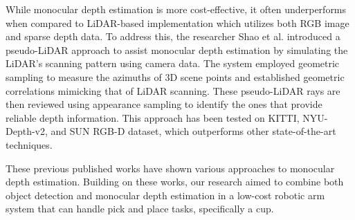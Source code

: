 \vspace{10pt}

While monocular depth estimation is more cost-effective, it often underperforms when compared to LiDAR-based implementation which utilizes both RGB image and sparse depth data. To address this, the researcher Shao et al. \cite{shuwei_shao__2024} introduced a pseudo-LiDAR approach to assist monocular depth estimation by simulating the LiDAR’s scanning pattern using camera data. The system employed geometric sampling to measure the azimuths of 3D scene points and established geometric correlations mimicking that of LiDAR scanning. These pseudo-LiDAR rays are then reviewed using appearance sampling to identify the ones that provide reliable depth information. This approach has been tested on KITTI, NYU-Depth-v2, and SUN RGB-D dataset, which outperforms other state-of-the-art techniques.

\vspace{10pt}

These previous published works have shown various approaches to monocular depth estimation. Building on these works, our research aimed to combine both object detection and monocular depth estimation in a low-cost robotic arm system that can handle pick and place tasks, specifically a cup.
